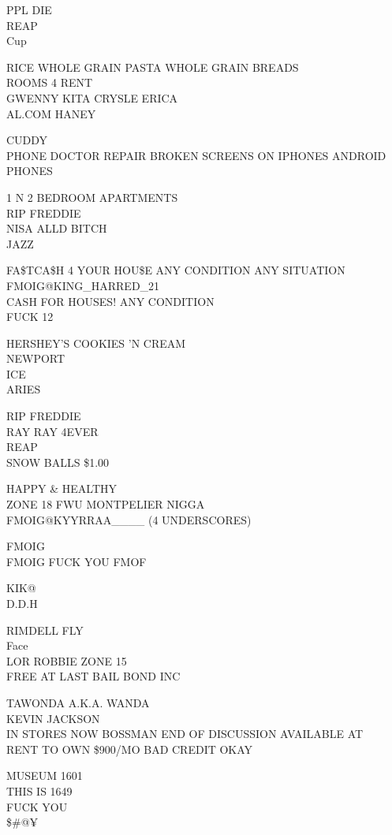 \documentclass[10pt,letterpaper]{article}
\begin{document}
PPL DIE\\
REAP\\
Cup

RICE WHOLE GRAIN PASTA WHOLE GRAIN BREADS\\
ROOMS 4 RENT\\
GWENNY KITA CRYSLE ERICA\\
AL.COM HANEY

CUDDY\\
PHONE DOCTOR REPAIR BROKEN SCREENS ON IPHONES ANDROID PHONES

1 N 2 BEDROOM APARTMENTS\\
RIP FREDDIE\\
NISA ALLD BITCH\\
JAZZ

FA\$TCA\$H 4 YOUR HOU\$E ANY CONDITION ANY SITUATION\\
FMOIG@KING\_HARRED\_21\\
CASH FOR HOUSES!  ANY CONDITION\\
FUCK 12

HERSHEY'S COOKIES 'N CREAM\\
NEWPORT\\
ICE\\
ARIES

RIP FREDDIE\\
RAY RAY 4EVER\\
REAP\\
SNOW BALLS \$1.00

HAPPY \& HEALTHY\\
ZONE 18 FWU MONTPELIER NIGGA\\
FMOIG@KYYRRAA\_\_\_\_ (4 UNDERSCORES)

FMOIG\\
FMOIG FUCK YOU FMOF

KIK@\\
D.D.H

RIMDELL FLY\\
Face\\
LOR ROBBIE ZONE 15\\
FREE AT LAST BAIL BOND INC

TAWONDA A.K.A. WANDA\\
KEVIN JACKSON\\
IN STORES NOW BOSSMAN END OF DISCUSSION AVAILABLE AT\\
RENT TO OWN \$900/MO BAD CREDIT OKAY

MUSEUM 1601\\
THIS IS 1649\\
FUCK YOU\\
\$\#@¥
\end{document}
